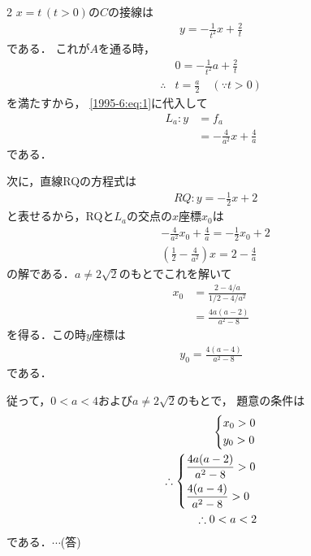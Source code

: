 \documentclass[../../../../main.tex]{subfiles}
\begin{document}
\begin{multicols}{2}
    $x=t\,(t>0)$の$C$の接線は
    \begin{align}
        y=-\frac{1}{t^2}x+\frac{2}{t} \label{1995-6:eq:1}
    \end{align}
    である．
    これが$A$を通る時，
    \begin{align*}
         & 0 = -\frac{1}{t^2}a+\frac{2}{t}      \\
        \therefore
         & t = \frac{a}{2} \quad (\because t>0)
    \end{align*}
    を満たすから，
    \cref{1995-6:eq:1}に代入して
    \begin{align*}
        L_a : y
         & = f_{a}                       \\
         & = -\frac{4}{a^2}x+\frac{4}{a}
    \end{align*}
    である．

    次に，直線RQの方程式は
    \begin{align}
         & RQ:y=-\frac{1}{2}x+2  \label{1995-6:eq:2}
    \end{align}
    と表せるから，RQと$L_a$の交点の$x$座標$x_0$は
    \begin{align*}
         & -\frac{4}{a^2}x_0+\frac{4}{a} = -\frac{1}{2}x_0+2 \\
         & (\frac{1}{2}-\frac{4}{a^2})x = 2-\frac{4}{a}
    \end{align*}
    の解である．$a \neq 2\sqrt{2}$のもとでこれを解いて
    \begin{align}
        x_0 & = \frac{2-4/a}{1/2-4/a^2}                    \\
            & = \frac{4a(a-2)}{a^2-8}  \label{1995-6:eq:3}
    \end{align}
    を得る．この時$y$座標は
    \begin{align}
        y_0  =  \frac{4(a-4)}{a^2-8}  \label{1995-6:eq:4}
    \end{align}
    である．

    従って，$0<a<4$および$a \neq 2\sqrt{2}$のもとで，
    題意の条件は
    \begin{align*}
        \begin{dcases}
            x_0 > 0 \\
            y_0 > 0
        \end{dcases}             \\
        \therefore
        \begin{dcases}
            \frac{4a(a-2)}{a^2-8} > 0 \\
            \frac{4(a-4)}{a^2-8} > 0
        \end{dcases} \\
        \therefore
        0 < a < 2
    \end{align*}
    である．$\cdots$(答)


\end{multicols}
\end{document}
